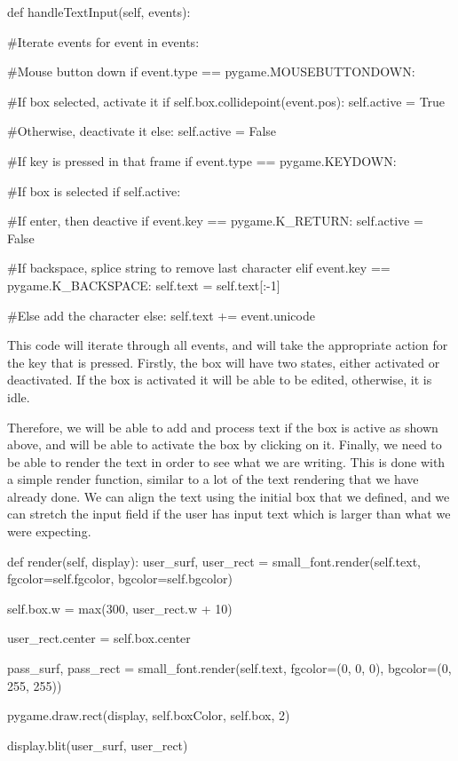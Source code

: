 \vs
\begin{mpy}
    def handleTextInput(self, events):

        #Iterate events
        for event in events:

            #Mouse button down
            if event.type == pygame.MOUSEBUTTONDOWN:

                #If box selected, activate it
                if self.box.collidepoint(event.pos):
                    self.active = True

                #Otherwise, deactivate it
                else:
                    self.active = False

            #If key is pressed in that frame
            if event.type == pygame.KEYDOWN:

                #If box is selected
                if self.active:

                    #If enter, then deactive
                    if event.key == pygame.K_RETURN:
                        self.active = False

                    #If backspace, splice string to remove last character
                    elif event.key == pygame.K_BACKSPACE:
                        self.text = self.text[:-1]

                    #Else add the character
                    else:
                        self.text += event.unicode
\end{mpy}

This code will iterate through all events, and will take the appropriate action for the key that is pressed. Firstly, the box will have two states, either activated or deactivated. If the box is activated it will be able to be edited, otherwise, it is idle.

\vs
Therefore, we will be able to add and process text if the box is active as shown above, and will be able to activate the box by clicking on it. Finally, we need to be able to render the text in order to see what we are writing. This is done with a simple render function, similar to a lot of the text rendering that we have already done. We can align the text using the initial box that we defined, and we can stretch the input field if the user has input text which is larger than what we were expecting.

\vs
\begin{mpy}
    def render(self, display):
        user_surf, user_rect = small_font.render(self.text, fgcolor=self.fgcolor, bgcolor=self.bgcolor)
        
        self.box.w = max(300, user_rect.w + 10)

        user_rect.center = self.box.center

        pass_surf, pass_rect = small_font.render(self.text, fgcolor=(0, 0, 0), bgcolor=(0, 255, 255))

        pygame.draw.rect(display, self.boxColor, self.box, 2)

        display.blit(user_surf, user_rect)
\end{mpy}

